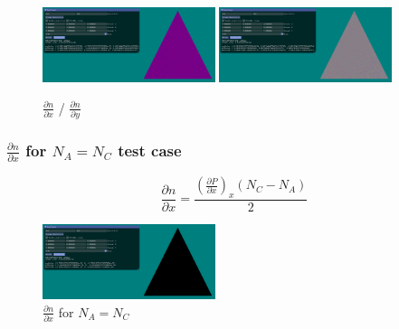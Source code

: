 \documentclass[12pt]{article}
\newcommand{\oneimgwidth}{0.45}
\newcommand{\dpdx}{\frac{\partial P}{\partial x}}
\newcommand{\dndx}{\frac{\partial n}{\partial x}}
\newcommand{\dndy}{\frac{\partial n}{\partial y}}
\begin{document}
\begin{figure}[htbp] 
	\centering
	\includegraphics[width=\oneimgwidth\textwidth]{dn/dndx.png}
	\includegraphics[width=\oneimgwidth\textwidth]{dn/dndy.png}
	\caption{$\dndx$ / $\dndy$}
	\label{fig:dndx}
\end{figure}

\FloatBarrier

\subsubsection{$\dndx$ for $N_A = N_C$ test case}

\begin{equation}
\dndx = \frac{\left(\dpdx\right)_x \left(N_C - N_A\right)}{2}
\end{equation}

\begin{figure}[htbp] 
	\centering
	\includegraphics[width=\oneimgwidth\textwidth]{dn/dndx_na_nc_equal.png}
	\caption{$\dndx$ for $N_A = N_C$}
	\label{fig:dndx}
\end{figure}
\end{document}
